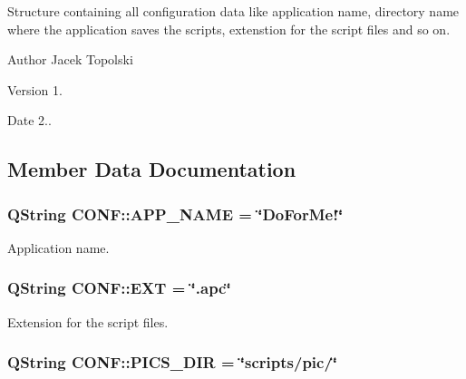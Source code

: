 Structure containing all configuration data like application name, directory name where the application saves the scripts, extenstion for the script files and so on. \begin{DoxyAuthor}{Author}
Jacek Topolski 
\end{DoxyAuthor}
\begin{DoxyVersion}{Version}
1. 
\end{DoxyVersion}
\begin{DoxyDate}{Date}
2.. 
\end{DoxyDate}


\subsection{Member Data Documentation}
\hypertarget{struct_c_o_n_f_a853a9ddc60b4267b40e436f0d990bea0}{
\subsubsection[{A\-P\-P\-\_\-\-N\-A\-M\-E}]{\setlength{\rightskip}{0pt plus 5cm}Q\-String C\-O\-N\-F\-::\-A\-P\-P\-\_\-\-N\-A\-M\-E = \char`\"{}Do\-For\-Me!\char`\"{}\hspace{0.3cm}{\ttfamily [static]}}}\label{struct_c_o_n_f_a853a9ddc60b4267b40e436f0d990bea0}


Application name. 

\hypertarget{struct_c_o_n_f_a341328f597b1f2990733b7ac30a8cb88}{
\subsubsection[{E\-X\-T}]{\setlength{\rightskip}{0pt plus 5cm}Q\-String C\-O\-N\-F\-::\-E\-X\-T = \char`\"{}.apc\char`\"{}\hspace{0.3cm}{\ttfamily [static]}}}\label{struct_c_o_n_f_a341328f597b1f2990733b7ac30a8cb88}


Extension for the script files. 

\hypertarget{struct_c_o_n_f_abc4633bb8e9a6a14e116abd19f2f391c}{
\subsubsection[{P\-I\-C\-S\-\_\-\-D\-I\-R}]{\setlength{\rightskip}{0pt plus 5cm}Q\-String C\-O\-N\-F\-::\-P\-I\-C\-S\-\_\-\-D\-I\-R = \char`\"{}scripts/pic/\char`\"{}\hspace{0.3cm}{\ttfamily [static]}}}\label{struct_c_o_n_f_abc4633bb8e9a6a14e116abd19f2f391c}


